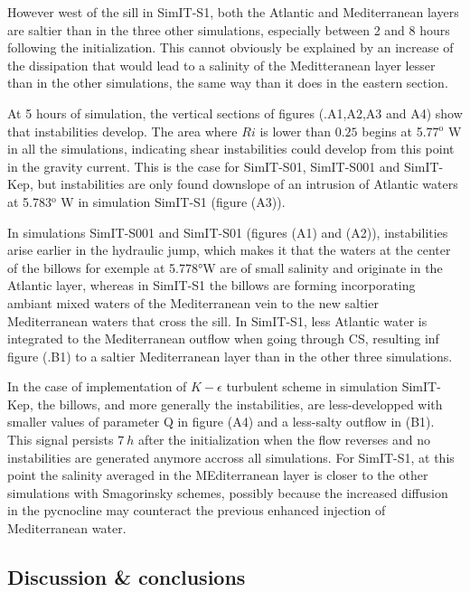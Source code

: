 However west of the sill in SimIT-S1, both the Atlantic and Mediterranean layers are saltier than in the three other simulations, especially between 2 and 8 hours following the initialization. This cannot obviously be explained by an increase of the dissipation that would lead to a salinity of the Meditteranean layer lesser than in the other simulations, the same way than it does in the eastern section.

At 5 hours of simulation, the vertical sections of figures (.A1,A2,A3 and A4) show that instabilities develop. The area where $Ri$ is lower than $0.25$ begins at 5.77$^\text{o}$ W in all the simulations, indicating shear instabilities could develop from this point in the gravity current. This is the case for SimIT-S01, SimIT-S001 and SimIT-Kep, but instabilities are only found downslope of an intrusion of Atlantic waters at 5.783$^\text{o}$ W in simulation SimIT-S1 (figure (A3)).

In simulations SimIT-S001 and SimIT-S01 (figures (A1) and (A2)), instabilities arise earlier in the hydraulic jump, which makes it that the waters at the center of the billows for exemple at 5.778°W are of small salinity and originate in the Atlantic layer, whereas in SimIT-S1 the billows are forming incorporating ambiant mixed waters of the Mediterranean vein to the new saltier Mediterranean waters that cross the sill. In SimIT-S1, less Atlantic water is integrated to the Mediterranean outflow when going through CS, resulting inf figure (.B1) to a saltier Mediterranean layer than in the other three simulations.
 
In the case of implementation of $K-\epsilon$ turbulent scheme in simulation SimIT-Kep, the billows, and more generally the instabilities, are less-developped with smaller values of parameter Q in figure (A4) and a less-salty outflow in (B1). This signal persists $7\ h$ after the initialization when the flow reverses and no instabilities are generated anymore accross all simulations. For SimIT-S1, at this point the salinity averaged in the MEditerranean layer is closer to the other simulations with Smagorinsky schemes, possibly because the increased diffusion in the pycnocline may counteract the previous enhanced injection of Mediterranean water.


\subsection{Discussion \& conclusions}
